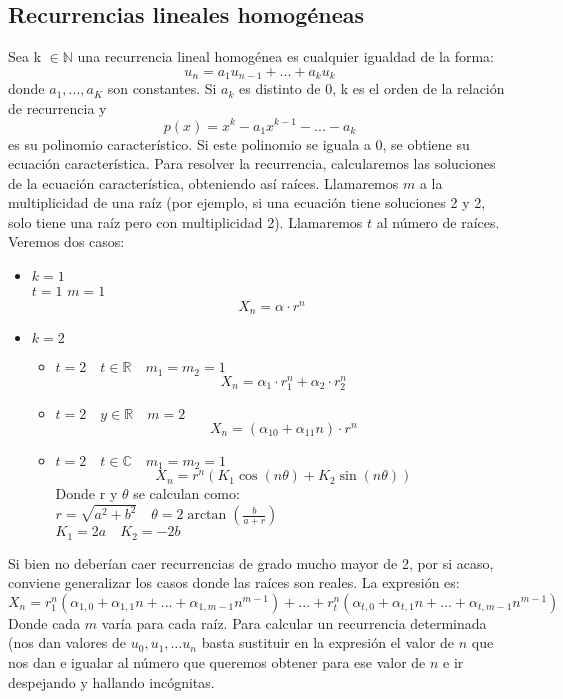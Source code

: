 \documentclass[a4paper]{article}
\theoremstyle{plain} \newtheorem{PrimerPrincipio}{Teorema}
\theoremstyle{plain} \newtheorem{SegundoPrincipio}{Teorema}
\begin{document}
\subsection{Recurrencias lineales homogéneas}
\large{Sea} k $\in \mathbb{N}$ una recurrencia lineal homogénea es cualquier igualdad de la forma:
$$u_n=a_1u_{n-1}+...+a_ku_k$$
donde $a_1,...,a_K$ son constantes. Si $a_k$ es distinto de 0, k es el orden de la relación de recurrencia y
$$p(x)=x^k-a_1x^{k-1}-...-a_k$$
es su polinomio característico. Si este polinomio se iguala a 0, se obtiene su ecuación característica.
Para resolver la recurrencia, calcularemos las soluciones de la ecuación característica, obteniendo así raíces. Llamaremos $m$ a la multiplicidad de una raíz (por ejemplo, si una ecuación tiene soluciones 2 y 2, solo tiene una raíz pero con multiplicidad 2). Llamaremos $t$ al número de raíces.
Veremos dos casos:
\begin{itemize}
\item $k=1$\\
$t=1$ $m=1$
$$X_n=\alpha\cdot r^n$$
\item $k=2$
\begin{itemize}
\item $t=2 \quad t\in\mathbb{R} \quad m_1=m_2=1$
$$X_n=\alpha_1\cdot r_1^n+\alpha_2\cdot r_2^n$$
\item $t=2 \quad y\in\mathbb{R} \quad m=2$
$$X_n=(\alpha_{10}+\alpha_{11}n)\cdot r^n$$
\item $t=2 \quad t\in\mathbb{C} \quad m_1=m_2=1$
$$X_n=r^n\left(K_1\cos(n\theta) + K_2\sin(n\theta)\right)$$
Donde r y $\theta$ se calculan como:\\
$r=\sqrt{a^2+b^2} \quad \theta=2\arctan(\frac{b}{a+r})$\\
$K_1=2a \quad K_2=-2b$
\end{itemize}
\end{itemize}
Si bien no deberían caer recurrencias de grado mucho mayor de 2, por si acaso, conviene generalizar los casos donde las raíces son reales. La expresión es:
$$X_n=r_1^n(\alpha_{1,0}+\alpha_{1,1}n+...+\alpha_{1,m-1}n^{m-1})+...+r_t^n(\alpha_{t,0}+\alpha_{t,1}n+...+\alpha_{t,m-1}n^{m-1})$$
Donde cada $m$ varía para cada raíz.
Para calcular un recurrencia determinada (nos dan valores de $u_0, u_1,\dots u_n$ basta sustituir en la expresión el valor de $n$ que nos dan e igualar al número que queremos obtener para ese valor de $n$ e ir despejando y hallando incógnitas.\\
\end{document}
